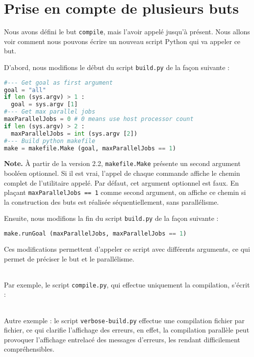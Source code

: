 \documentclass[a4paper,11pt]{extarticle}
\begin{document}
\section{Prise en compte de plusieurs buts}

Nous avons défini le but \texttt{compile}, mais l'avoir appelé jusqu'à présent. Nous allons voir comment nous pouvons écrire un nouveau script Python qui va appeler ce but.

D'abord, nous modifions le début du script \texttt{build.py} de la façon suivante :
\begin{lstlisting}[language=py]
#--- Get goal as first argument
goal = "all"
if len (sys.argv) > 1 :
  goal = sys.argv [1]
#--- Get max parallel jobs
maxParallelJobs = 0 # 0 means use host processor count
if len (sys.argv) > 2 :
  maxParallelJobs = int (sys.argv [2])
#--- Build python makefile
make = makefile.Make (goal, maxParallelJobs == 1)
\end{lstlisting}

{\bf Note.}\label{logUtilityToolPath2} À partir de la version 2.2, \texttt{makefile.Make} présente un second argument booléen optionnel.  Si il est vrai, l'appel de chaque commande affiche le chemin complet de l'utilitaire appelé. Par défaut, cet argument optionnel est faux. En plaçant \texttt{maxParallelJobs == 1} comme second argument, on affiche ce chemin si la construction des buts est réalisée séquentiellement, sans parallélisme.

Ensuite, nous modifions la fin du script \texttt{build.py} de la façon suivante :
\begin{lstlisting}[language=py]
make.runGoal (maxParallelJobs, maxParallelJobs == 1)
\end{lstlisting}

Ces modifications permettent d'appeler ce script avec différents arguments, ce qui permet de préciser le but et le parallélisme.

~\\Par exemple, le script \texttt{compile.py}, qui effectue uniquement la compilation, s'écrit :



~\\Autre exemple : le script \texttt{verbose-build.py} effectue une compilation fichier par fichier, ce qui clarifie l'affichage des erreurs, en effet, la compilation parallèle peut provoquer l'affichage entrelacé des messages d'erreurs, les rendant difficilement compréhensibles.

\end{document}
